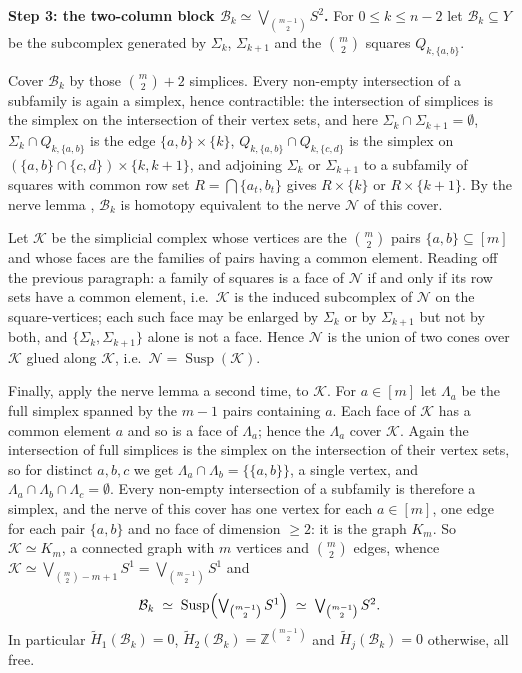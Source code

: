 \documentclass[11pt]{amsart}
\newcommand{\Hred}{\widetilde H}
\begin{document}
\medskip
\noindent\textbf{Step 3: the two-column block $\mathcal B_k \simeq \bigvee_{\binom{m-1}{2}} S^2$.}
For $0 \le k \le n-2$ let $\mathcal B_k \subseteq Y$ be the subcomplex generated by $\Sigma_k$,
$\Sigma_{k+1}$ and the $\binom{m}{2}$ squares $Q_{k,\{a,b\}}$.

Cover $\mathcal B_k$ by those $\binom m2 + 2$ simplices. Every non-empty intersection of a
subfamily is again a simplex, hence contractible: the intersection of simplices is the simplex on
the intersection of their vertex sets, and here
$\Sigma_k \cap \Sigma_{k+1} = \emptyset$,
$\Sigma_k \cap Q_{k,\{a,b\}}$ is the edge $\{a,b\}\times\{k\}$,
$Q_{k,\{a,b\}} \cap Q_{k,\{c,d\}}$ is the simplex on $(\{a,b\}\cap\{c,d\})\times\{k,k+1\}$, and
adjoining $\Sigma_k$ or $\Sigma_{k+1}$ to a subfamily of squares with common row set
$R = \bigcap\{a_t,b_t\}$ gives $R\times\{k\}$ or $R\times\{k+1\}$. By the nerve lemma
\cite[Theorem~10.6]{Bjorner}, $\mathcal B_k$ is homotopy equivalent to the nerve $\mathcal N$ of
this cover.

Let $\mathcal K$ be the simplicial complex whose vertices are the $\binom m2$ pairs
$\{a,b\}\subseteq[m]$ and whose faces are the families of pairs having a common element. Reading
off the previous paragraph: a family of squares is a face of $\mathcal N$ if and only if its row
sets have a common element, i.e.\ $\mathcal K$ is the induced subcomplex of $\mathcal N$ on the
square-vertices; each such face may be enlarged by $\Sigma_k$ or by $\Sigma_{k+1}$ but not by
both, and $\{\Sigma_k,\Sigma_{k+1}\}$ alone is not a face. Hence $\mathcal N$ is the union of two
cones over $\mathcal K$ glued along $\mathcal K$, i.e.\ $\mathcal N = \operatorname{Susp}(\mathcal K)$.

Finally, apply the nerve lemma a second time, to $\mathcal K$. For $a \in [m]$ let $\Lambda_a$ be
the full simplex spanned by the $m-1$ pairs containing $a$. Each face of $\mathcal K$ has a common
element $a$ and so is a face of $\Lambda_a$; hence the $\Lambda_a$ cover $\mathcal K$. Again the
intersection of full simplices is the simplex on the intersection of their vertex sets, so for
distinct $a,b,c$ we get $\Lambda_a \cap \Lambda_b = \{\{a,b\}\}$, a single vertex, and
$\Lambda_a \cap \Lambda_b \cap \Lambda_c = \emptyset$. Every non-empty intersection of a subfamily
is therefore a simplex, and the nerve of this cover has one vertex for each $a \in [m]$, one edge
for each pair $\{a,b\}$ and no face of dimension $\ge 2$: it is the graph $K_m$. So
$\mathcal K \simeq K_m$, a connected graph with $m$ vertices and $\binom m2$ edges, whence
$\mathcal K \simeq \bigvee_{\binom m2 - m + 1} S^1 = \bigvee_{\binom{m-1}{2}} S^1$ and
\begin{equation}\label{eq:block}
  \mathcal B_k \;\simeq\; \operatorname{Susp}\Bigl(\textstyle\bigvee_{\binom{m-1}2}S^1\Bigr)
  \;\simeq\; \textstyle\bigvee_{\binom{m-1}{2}} S^2 .
\end{equation}
In particular $\Hred_1(\mathcal B_k) = 0$, $\Hred_2(\mathcal B_k) = \mathbb Z^{\binom{m-1}2}$ and
$\Hred_j(\mathcal B_k)=0$ otherwise, all free.
\end{document}
